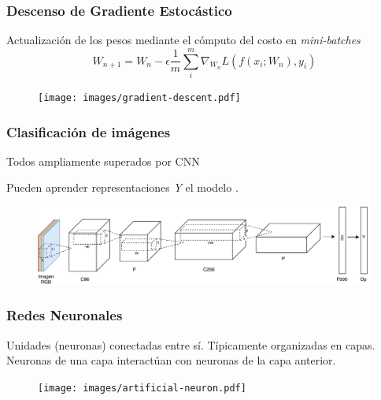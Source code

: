 \documentclass{beamer}
\begin{document}
\begin{frame}[plain]
\frametitle{Descenso de Gradiente Estocástico}
\vfill
Actualización de los pesos mediante el cómputo del costo en \textit{mini-batches}
\vfill
\begin{equation}
    W_{n+1} = W_n - \epsilon \frac{1}{m} \sum^{m}_{i} \nabla_{W_{n}} L(f(x_i; W_n), y_i)
\end{equation}
\vfill
\begin{figure}
    \centering
    \texttt{[image: images/gradient-descent.pdf]}
\end{figure}
\end{frame}





\begin{frame}[plain]
\frametitle{Clasificación de imágenes}

Todos ampliamente superados por CNN

Pueden aprender representaciones \emph{Y} el modelo .
\begin{figure}
    \centering
    \includegraphics[width=\textwidth]{images/net_example.pdf}
\end{figure}
\end{frame}





\begin{frame}[plain]
\frametitle{Redes Neuronales}
Unidades (neuronas) conectadas entre sí.
\vfill
Típicamente organizadas en capas.
\vfill
Neuronas de una capa interactúan con neuronas de la capa anterior.
\begin{figure}
    \centering
    \texttt{[image: images/artificial-neuron.pdf]}
\end{figure}
\end{frame}
\end{document}
